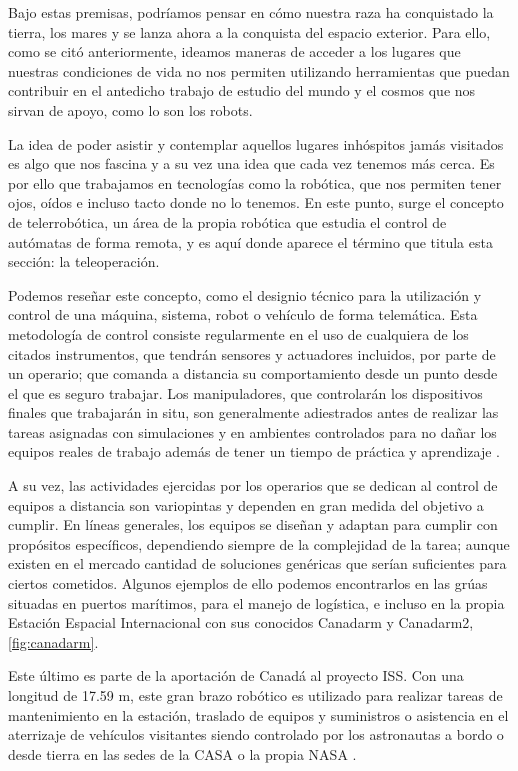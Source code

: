 Bajo estas premisas, podríamos pensar en cómo nuestra raza ha conquistado la tierra, los mares y se lanza ahora a la conquista del espacio exterior. Para ello, como se citó anteriormente, ideamos maneras de acceder a los lugares que nuestras condiciones de vida no nos permiten utilizando herramientas que puedan contribuir en el antedicho trabajo de estudio del mundo y el cosmos que nos sirvan de apoyo, como lo son los robots.

La idea de poder asistir y contemplar aquellos lugares inhóspitos jamás visitados es algo que nos fascina y a su vez una idea que cada vez tenemos más cerca. Es por ello que trabajamos en tecnologías como la robótica, que nos permiten tener ojos, oídos e incluso tacto donde no lo tenemos. En este punto, surge el concepto de telerrobótica, un área de la propia robótica que estudia el control de autómatas de forma remota, y es aquí donde aparece el término que titula esta sección: la teleoperación.

Podemos reseñar este concepto, como el designio técnico para  la utilización y control de una máquina, sistema, robot o vehículo de forma telemática. Esta metodología de control consiste regularmente en el uso de cualquiera de los citados instrumentos, que tendrán sensores y actuadores incluidos, por parte de un operario; que comanda a distancia su comportamiento desde un punto desde el que es seguro trabajar. Los manipuladores, que controlarán los dispositivos finales que trabajarán in situ, son generalmente adiestrados antes de realizar las tareas asignadas  con simulaciones y en ambientes controlados para no dañar los equipos reales de trabajo además de tener un tiempo de práctica y aprendizaje \cite{5}. 

A su vez, las actividades ejercidas por los operarios que se dedican al control de equipos a distancia son variopintas y dependen en gran medida del objetivo a cumplir. En líneas generales, los equipos se diseñan y adaptan para cumplir con propósitos específicos, dependiendo siempre de la complejidad de la tarea; aunque existen en el mercado cantidad de soluciones genéricas que serían suficientes para ciertos cometidos. Algunos ejemplos de ello podemos encontrarlos en las grúas situadas en puertos marítimos, para el manejo de logística, e incluso en la propia Estación Espacial Internacional con sus conocidos Canadarm y Canadarm2, \ref{fig:canadarm}.

Este último es parte de la aportación de Canadá al proyecto ISS. Con una longitud de  17.59 m, este gran brazo robótico es utilizado para realizar tareas de mantenimiento en la estación, traslado de equipos y suministros o asistencia en el aterrizaje de vehículos visitantes siendo controlado por los astronautas a bordo o desde tierra en las sedes de la CASA o la propia NASA \cite{90}. 

